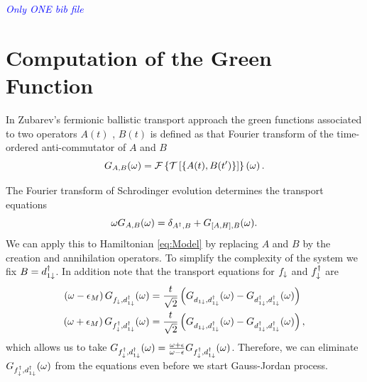\documentclass[showpacs,aps,prb,reprint,superscriptaddress]{revtex4-1}
\newcommand{\LUIS}[1]{\textcolor{blue}{\fbox{Luis} {\sl#1}}}
\begin{document}
\LUIS{Only ONE bib file}




%


 \appendix
 
 
 \section{Computation of the Green Function \label{sec:Appendix_alg}}
 In Zubarev's fermionic ballistic transport approach \cite{zubarev_double-time_1960} the green functions associated to two operators $A(t)$ , $B(t)$ is defined as that Fourier transform of the time-ordered anti-commutator of $A$ and $B$
\begin{equation}
  G_{A,B}(\omega)= \mathcal{F}\left\{ \mathcal{T}\left[\left\{ A(t),B(t')\right\} \right]\right\} \left(\omega\right).
  \label{eq:greenFunction}
\end{equation}

The Fourier transform of Schrodinger evolution determines the transport equations 
\begin{equation}
    \omega G_{A,B}(\omega)=\delta_{A^{\dagger},B}+G_{\left[A,H\right],B}(\omega).
    \label{eq:Transport}
\end{equation}
\noindent We can apply this to Hamiltonian \eqref{eq:Model} by replacing $A$ and $B$ by the creation and annihilation operators. To simplify the complexity of the system we fix $B = d^\dagger_{1\downarrow}$. In addition note that the transport equations for $f_\downarrow$ and $f^\dagger_\downarrow$ are 
\begin{align}
        \left(\omega-\epsilon_{M}\right)G_{f_{\downarrow},d_{1\downarrow}^{\dagger}}(\omega)&=\frac{t}{\sqrt{2}}\left(G_{d_{1\downarrow},d_{1\downarrow}^{\dagger}}(\omega)-G_{d_{1\downarrow}^{\dagger},d_{1\downarrow}^{\dagger}}(\omega)\right) \\
    \left(\omega+\epsilon_{M}\right)G_{f_{\downarrow}^{\dagger},d_{1\downarrow}^{\dagger}}(\omega)&=\frac{t}{\sqrt{2}}\left(G_{d_{1\downarrow},d_{1\downarrow}^{\dagger}}(\omega)-G_{d_{1\downarrow}^{\dagger},d_{1\downarrow}^{\dagger}}(\omega)\right),
\end{align}
\noindent which allows us to take $G_{f_{\downarrow}^{\dagger},d_{1\downarrow}^{\dagger}}(\omega) = \frac{\omega + \epsilon}{\omega -\epsilon}G_{f_{\downarrow}^{\dagger},d_{1\downarrow}^{\dagger}}(\omega) $. Therefore, we can eliminate $G_{f_{\downarrow}^{\dagger},d_{1\downarrow}^{\dagger}}(\omega) $ from the equations even before we start Gauss-Jordan process.
\end{document}
